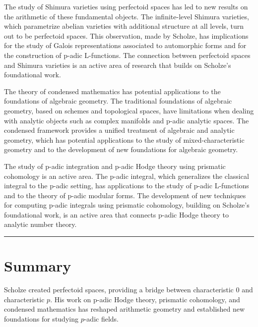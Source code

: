 The study of Shimura varieties using perfectoid spaces has led to new results on the arithmetic of these fundamental objects. The infinite-level Shimura varieties, which parametrize abelian varieties with additional structure at all levels, turn out to be perfectoid spaces. This observation, made by Scholze, has implications for the study of Galois representations associated to automorphic forms and for the construction of p-adic L-functions. The connection between perfectoid spaces and Shimura varieties is an active area of research that builds on Scholze's foundational work.

The theory of condensed mathematics has potential applications to the foundations of algebraic geometry. The traditional foundations of algebraic geometry, based on schemes and topological spaces, have limitations when dealing with analytic objects such as complex manifolds and p-adic analytic spaces. The condensed framework provides a unified treatment of algebraic and analytic geometry, which has potential applications to the study of mixed-characteristic geometry and to the development of new foundations for algebraic geometry.

The study of p-adic integration and p-adic Hodge theory using prismatic cohomology is an active area. The p-adic integral, which generalizes the classical integral to the p-adic setting, has applications to the study of p-adic L-functions and to the theory of p-adic modular forms. The development of new techniques for computing p-adic integrals using prismatic cohomology, building on Scholze's foundational work, is an active area that connects p-adic Hodge theory to analytic number theory.

\begin{center}\rule{0.5\linewidth}{0.5pt}\end{center}

\section*{Summary}

Scholze created perfectoid spaces, providing a bridge between characteristic 0 and characteristic $p$. His work on p-adic Hodge theory, prismatic cohomology, and condensed mathematics has reshaped arithmetic geometry and established new foundations for studying $p$-adic fields.
